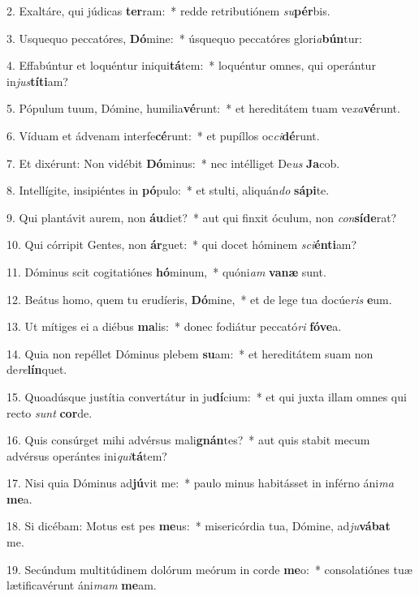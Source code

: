 2. Exaltáre, qui júdicas \textbf{ter}ram:~*  redde retributiónem \textit{su}\textbf{pér}bis.\

3. Usquequo peccatóres, \textbf{Dó}mine:~*  úsquequo peccatóres glori\textit{a}\textbf{bún}tur:\

4. Effabúntur et loquéntur iniqui\textbf{tá}tem:~*  loquéntur omnes, qui operántur in\textit{jus}\textbf{tí}\textbf{ti}am?\

5. Pópulum tuum, Dómine, humilia\textbf{vé}runt:~*  et hereditátem tuam ve\textit{xa}\textbf{vé}runt.\

6. Víduam et ádvenam interfe\textbf{cé}runt:~*  et pupíllos oc\textit{ci}\textbf{dé}runt.\

7. Et dixérunt: Non vidébit \textbf{Dó}minus:~*  nec intélliget De\textit{us} \textbf{Ja}cob.\

8. Intellígite, insipiéntes in \textbf{pó}pulo:~*  et stulti, aliquán\textit{do} \textbf{sá}\textbf{pi}te.\

9. Qui plantávit aurem, non \textbf{áu}diet?~*  aut qui finxit óculum, non \textit{con}\textbf{sí}\textbf{de}rat?\

10. Qui córripit Gentes, non \textbf{ár}guet:~*  qui docet hóminem \textit{sci}\textbf{én}\textbf{ti}am?\

11. Dóminus scit cogitatiónes \textbf{hó}minum,~*  quóni\textit{am} \textbf{va}\textbf{næ} sunt.\

12. Beátus homo, quem tu erudíeris, \textbf{Dó}mine,~*  et de lege tua docúe\textit{ris} \textbf{e}um.\

13. Ut mítiges ei a diébus \textbf{ma}lis:~*  donec fodiátur peccató\textit{ri} \textbf{fó}\textbf{ve}a.\

14. Quia non repéllet Dóminus plebem \textbf{su}am:~*  et hereditátem suam non de\textit{re}\textbf{lín}quet.\

15. Quoadúsque justítia convertátur in ju\textbf{dí}cium:~*  et qui juxta illam omnes qui recto \textit{sunt} \textbf{cor}de.\

16. Quis consúrget mihi advérsus mali\textbf{gnán}tes?~*  aut quis stabit mecum advérsus operántes ini\textit{qui}\textbf{tá}tem?\

17. Nisi quia Dóminus ad\textbf{jú}vit me:~*  paulo minus habitásset in inférno áni\textit{ma} \textbf{me}a.\

18. Si dicébam: Motus est pes \textbf{me}us:~*  misericórdia tua, Dómine, ad\textit{ju}\textbf{vá}\textbf{bat} me.\

19. Secúndum multitúdinem dolórum meórum in corde \textbf{me}o:~*  consolatiónes tuæ lætificavérunt áni\textit{mam} \textbf{me}am.\

